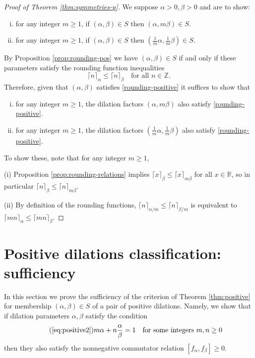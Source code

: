 \documentclass[11pt, letterpaper, reqno]{amsart}
\theoremstyle{definition}
\numberwithin{equation}{section}
\newcommand{\RR}{\ensuremath{\mathbb{R}}}
\newcommand{\ZZ}{\ensuremath{\mathbb{Z}}}
\newcommand{\ceil}[1]{\lceil{#1}\rceil}
\begin{document}
\begin{proof}[Proof of Theorem \ref{thm:symmetries-p}]
We suppose $\alpha >0, \beta >0$ and are to show:
\begin{enumerate}[(i)]
\item for any integer $m\geq 1$,  if $(\alpha, \beta) \in S$  then $( \alpha, {m}\beta)\in S$.
\item for any integer $m\geq 1$,  if $(\alpha, \beta) \in S$  then $(\frac{1}{m}{\alpha}, \frac{1}{m}\beta) \in S$.
\end{enumerate}
By  Proposition \ref{prop:rounding-pos}  we have $(\alpha, \beta) \in S$ if and only if 
these parameters satisfy the rounding function  inequalities
\begin{equation}\label{rounding-positive}
\ceil{n}_\alpha \leq \ceil{n}_\beta \quad\text{for all }n\in\ZZ .
\end{equation}
Therefore, given that $(\alpha,\beta)$ satisfies \eqref{rounding-positive} it suffices to show that
\begin{enumerate}[(i)]
\item for any integer $m\geq 1$,  the dilation factors $( \alpha, {m}\beta)$ also satisfy  \eqref{rounding-positive}.
\item  for any integer $m\geq 1$,  the dilation factors $(\frac{1}{m}{\alpha}, \frac{1}{m}\beta)$ also satisfy
 \eqref{rounding-positive}.
\end{enumerate}
To show these, note that for any integer $m \ge 1$,

(i)  Proposition \ref{prop:rounding-relations} implies $\ceil{x}_\beta \leq \ceil{x}_{m\beta}$ for all $x\in\RR$, so in particular $\ceil{n}_\beta \leq \ceil{n}_{m\beta}$.

(ii) By definition of the rounding functions,
 $\ceil{n}_{\alpha/m} \leq \ceil{n}_{\beta/m} $ is equivalent to $\ceil{mn}_\alpha \leq \ceil{mn}_\beta$.
\end{proof}


%
%
\section{Positive dilations classification: sufficiency}
\label{sec:positive-S}
\setcounter{equation}{0}

In this section we prove the sufficiency of   the criterion of Theorem \ref{thm:positive}
for  membership  $(\alpha, \beta) \in S$ of a pair of positive  dilations.
Namely, we show that if dilation parameters $\alpha, \beta$ satisfy the condition
\begin{equation}
\tag{\ref{eq:positive2}} 
m\alpha + n\frac{\alpha}{\beta} = 1 \quad\text{for some integers }m,n\geq 0
\end{equation}
then they also satisfy the nonnegative commutator relation $[f_\alpha, f_\beta]\geq 0$.
\end{document}
